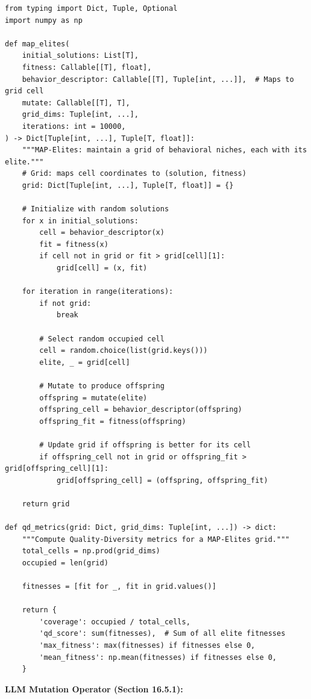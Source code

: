 \begin{verbatim}
from typing import Dict, Tuple, Optional
import numpy as np

def map_elites(
    initial_solutions: List[T],
    fitness: Callable[[T], float],
    behavior_descriptor: Callable[[T], Tuple[int, ...]],  # Maps to grid cell
    mutate: Callable[[T], T],
    grid_dims: Tuple[int, ...],
    iterations: int = 10000,
) -> Dict[Tuple[int, ...], Tuple[T, float]]:
    """MAP-Elites: maintain a grid of behavioral niches, each with its elite."""
    # Grid: maps cell coordinates to (solution, fitness)
    grid: Dict[Tuple[int, ...], Tuple[T, float]] = {}

    # Initialize with random solutions
    for x in initial_solutions:
        cell = behavior_descriptor(x)
        fit = fitness(x)
        if cell not in grid or fit > grid[cell][1]:
            grid[cell] = (x, fit)

    for iteration in range(iterations):
        if not grid:
            break

        # Select random occupied cell
        cell = random.choice(list(grid.keys()))
        elite, _ = grid[cell]

        # Mutate to produce offspring
        offspring = mutate(elite)
        offspring_cell = behavior_descriptor(offspring)
        offspring_fit = fitness(offspring)

        # Update grid if offspring is better for its cell
        if offspring_cell not in grid or offspring_fit > grid[offspring_cell][1]:
            grid[offspring_cell] = (offspring, offspring_fit)

    return grid

def qd_metrics(grid: Dict, grid_dims: Tuple[int, ...]) -> dict:
    """Compute Quality-Diversity metrics for a MAP-Elites grid."""
    total_cells = np.prod(grid_dims)
    occupied = len(grid)

    fitnesses = [fit for _, fit in grid.values()]

    return {
        'coverage': occupied / total_cells,
        'qd_score': sum(fitnesses),  # Sum of all elite fitnesses
        'max_fitness': max(fitnesses) if fitnesses else 0,
        'mean_fitness': np.mean(fitnesses) if fitnesses else 0,
    }
\end{verbatim}

\textbf{LLM Mutation Operator (Section 16.5.1):}

